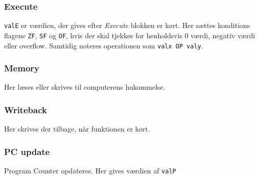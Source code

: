 \subsubsection{Execute}
\verb|valE| er værdien, der gives efter \textit{Execute} blokken er kørt.
Her sættes konditions flagene \verb|ZF|, \verb|SF| og \verb|OF|, hvis der skal tjekkes for henholdsvis 0 værdi, negativ værdi eller overflow.
Samtidig noteres operationen som \verb|valx OP valy|.

\subsubsection{Memory}
Her læses eller skrives til computerens hukommelse.

\subsubsection{Writeback}
Her skrives der tilbage, når funktionen er kørt.

\subsubsection{PC update}
Program Counter opdateres.
Her gives værdien af \verb|valP|

